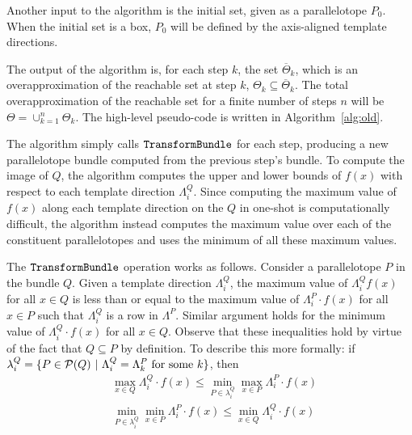 Another input to the algorithm is the initial set, given as a parallelotope $P_0$. When the initial set is a box, $P_0$ will be defined by the axis-aligned template directions.

The output of the algorithm is, for each step $k$, the set $\overline\Theta_k$, which is an overapproximation of the reachable set at step $k$, $\Theta_k \subseteq \overline\Theta_k$. The total overapproximation of the reachable set for a finite number of steps $n$ will be $\Theta = \cup_{k=1}^n \Theta_k$.
%
The high-level pseudo-code is written in Algorithm~\ref{alg:old}.

The algorithm simply calls $\texttt{TransformBundle}$ for each step, producing a new parallelotope bundle computed from the previous step's bundle.
%
To compute the image of $Q$, the algorithm computes the upper and lower bounds of $f(x)$ with respect to each template direction $\Lambda_i^Q$.
%
Since computing the maximum value of $f(x)$ along each template direction on the $Q$ in one-shot is computationally difficult, the algorithm instead computes the maximum value over each of the constituent parallelotopes and uses the minimum of all these maximum values.

The $\texttt{TransformBundle}$  operation works as follows.
%
Consider a parallelotope $P$ in the bundle $Q$.
%
Given a template direction $\Lambda_i^Q$, the maximum value of $\Lambda_{i}^Q f(x)$ for all $x \in Q$ is less than or equal to the maximum value of $\Lambda_{i}^P \cdot f(x)$ for all $x \in P$ such that $\Lambda_i^Q$ is a row in $\Lambda^P$.
%
Similar argument holds for the minimum value of $\Lambda_{i}^Q \cdot f(x)$ for all $x \in Q$.
%
Observe that these inequalities hold by virtue of the fact that $Q \subseteq P$ by definition.
%
To describe this more formally: if $\lambda^Q_i = \{ P \in \mathcal{P}(Q) ~|~ \Lambda_i^Q = \Lambda_k^P \text{ for some } k \}$, then
%
\begin{align}
    & \max_{x \in Q}{\Lambda_{i}^Q \cdot f(x)} \leq \min_{P \in \lambda^Q_i} {\max_{x \in P}{\Lambda_{i}^P \cdot f(x)}}  \label{eq:max_over_ptopes}
 \\
    & \min_{P \in \lambda^Q_i} {\min_{x \in P}{\Lambda_{i}^P \cdot f(x)}} \leq \min_{x \in Q}{\Lambda_{i}^Q \cdot f(x)} \label{eq:min_over_ptopes}
\end{align}

